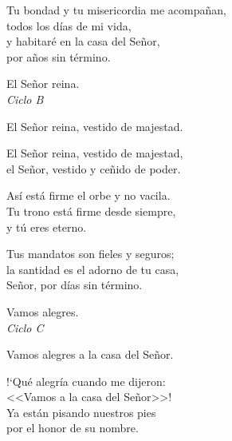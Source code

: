 \documentclass[12pt, letterpaper]{report}
\begin{document}
    \noindent
    Tu bondad y tu misericordia me acompa\~nan,\\
    todos los d\'ias de mi vida,\\
    y habitar\'e en la casa del Se\~nor,\\
    por a\~nos sin t\'ermino.
    \clearpage



    \noindent
    {\large El Señor reina.}\\
    \textit{Ciclo B}

    \noindent
    El Se\~nor reina, vestido de majestad.

    \noindent
    El Se\~nor reina, vestido de majestad,\\
    el Se\~nor, vestido y ce\~nido de poder.

    \noindent
    As\'i est\'a firme el orbe y no vacila.\\
    Tu trono est\'a firme desde siempre,\\
    y t\'u eres eterno.

    \noindent
    Tus mandatos son fieles y seguros;\\
    la santidad es el adorno de tu casa,\\
    Se\~nor, por d\'ias sin t\'ermino.
    \clearpage



    \noindent
    {\large Vamos alegres.}\\
    \textit{Ciclo C}

    \noindent
    Vamos alegres a la casa del Se\~nor.

    \noindent
    !`Qu\'e alegr\'ia cuando me dijeron:\\
    <<Vamos a la casa del Se\~nor>>!\\
    Ya est\'an pisando nuestros pies\\
    por el honor de su nombre.
\end{document}
